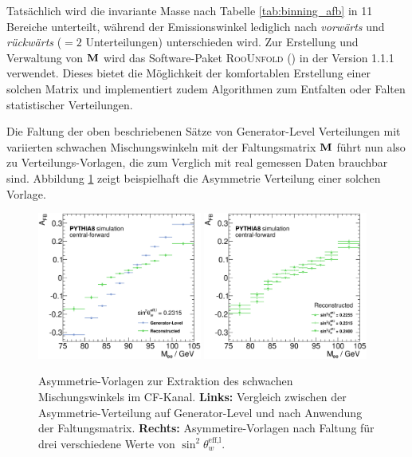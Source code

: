 Tatsächlich wird die invariante Masse nach Tabelle \ref{tab:binning_afb} in 11
Bereiche unterteilt, während der Emissionswinkel lediglich nach
\textit{vorwärts} und \textit{rückwärts} ($=2$ Unterteilungen) unterschieden
wird. Zur Erstellung und Verwaltung von $\bf{M}$ wird das Software-Paket
\textsc{RooUnfold} (\cite{2011arXiv1105.1160A}) in der Version 1.1.1 verwendet.
Dieses bietet die Möglichkeit der komfortablen Erstellung einer solchen Matrix
und implementiert zudem Algorithmen zum Entfalten oder Falten statistischer
Verteilungen.

Die Faltung der oben beschriebenen Sätze von Generator-Level Verteilungen mit
variierten schwachen Mischungswinkeln mit der Faltungsmatrix $\bf{M}$ führt nun
also zu Verteilungs-Vorlagen, die zum Verglich mit real gemessen Daten
brauchbar sind. Abbildung \ref{fig:vorlage} zeigt beispielhaft die Asymmetrie
Verteilung einer solchen Vorlage.

\begin{figure}
    \centering
    \includegraphics[width=0.48\textwidth]{plots/templates_cf_comp}
    \hfill
    \includegraphics[width=0.48\textwidth]{plots/templates_cf}
    \caption[Asymmetrie-Vorlagen zur Extraktion des schwachen Mischungswinkels]
        {Asymmetrie-Vorlagen zur Extraktion des schwachen Mischungswinkels im
        \ac{CF}-Kanal. \textbf{Links:} Vergleich zwischen der
        Asymmetrie-Verteilung auf Generator-Level und nach Anwendung der
        Faltungsmatrix. \textbf{Rechts:} Asymmetire-Vorlagen nach Faltung für
        drei verschiedene Werte von $\sin^2\theta_w^\text{eff,l}$.}
    \label{fig:vorlage}
\end{figure}

